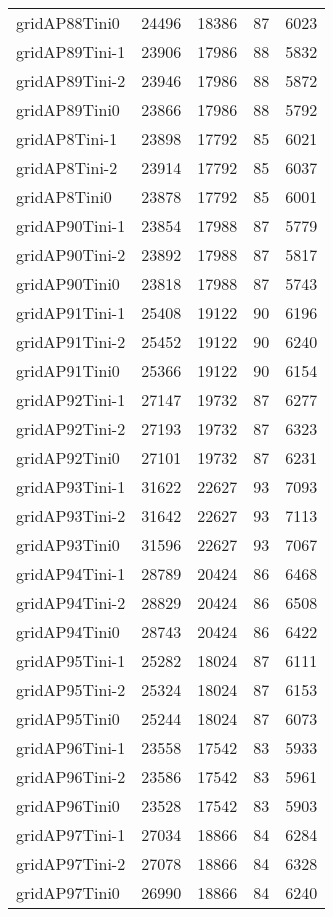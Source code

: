 \begin{longtable}{lrrrr}
gridAP88Tini0 & 24496 & 18386 & 87 & 6023 \\
gridAP89Tini-1 & 23906 & 17986 & 88 & 5832 \\
gridAP89Tini-2 & 23946 & 17986 & 88 & 5872 \\
gridAP89Tini0 & 23866 & 17986 & 88 & 5792 \\
gridAP8Tini-1 & 23898 & 17792 & 85 & 6021 \\
gridAP8Tini-2 & 23914 & 17792 & 85 & 6037 \\
gridAP8Tini0 & 23878 & 17792 & 85 & 6001 \\
gridAP90Tini-1 & 23854 & 17988 & 87 & 5779 \\
gridAP90Tini-2 & 23892 & 17988 & 87 & 5817 \\
gridAP90Tini0 & 23818 & 17988 & 87 & 5743 \\
gridAP91Tini-1 & 25408 & 19122 & 90 & 6196 \\
gridAP91Tini-2 & 25452 & 19122 & 90 & 6240 \\
gridAP91Tini0 & 25366 & 19122 & 90 & 6154 \\
gridAP92Tini-1 & 27147 & 19732 & 87 & 6277 \\
gridAP92Tini-2 & 27193 & 19732 & 87 & 6323 \\
gridAP92Tini0 & 27101 & 19732 & 87 & 6231 \\
gridAP93Tini-1 & 31622 & 22627 & 93 & 7093 \\
gridAP93Tini-2 & 31642 & 22627 & 93 & 7113 \\
gridAP93Tini0 & 31596 & 22627 & 93 & 7067 \\
gridAP94Tini-1 & 28789 & 20424 & 86 & 6468 \\
gridAP94Tini-2 & 28829 & 20424 & 86 & 6508 \\
gridAP94Tini0 & 28743 & 20424 & 86 & 6422 \\
gridAP95Tini-1 & 25282 & 18024 & 87 & 6111 \\
gridAP95Tini-2 & 25324 & 18024 & 87 & 6153 \\
gridAP95Tini0 & 25244 & 18024 & 87 & 6073 \\
gridAP96Tini-1 & 23558 & 17542 & 83 & 5933 \\
gridAP96Tini-2 & 23586 & 17542 & 83 & 5961 \\
gridAP96Tini0 & 23528 & 17542 & 83 & 5903 \\
gridAP97Tini-1 & 27034 & 18866 & 84 & 6284 \\
gridAP97Tini-2 & 27078 & 18866 & 84 & 6328 \\
gridAP97Tini0 & 26990 & 18866 & 84 & 6240 \\

\end{longtable}

